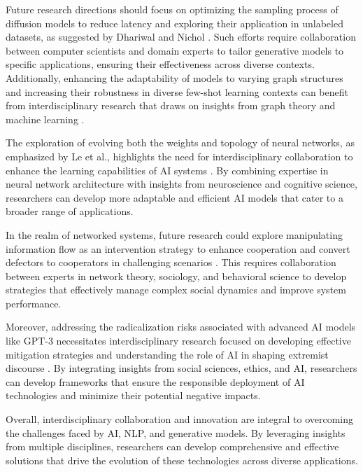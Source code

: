 Future research directions should focus on optimizing the sampling process of diffusion models to reduce latency and exploring their application in unlabeled datasets, as suggested by Dhariwal and Nichol \cite{dhariwal2021diffusion}. Such efforts require collaboration between computer scientists and domain experts to tailor generative models to specific applications, ensuring their effectiveness across diverse contexts. Additionally, enhancing the adaptability of models to varying graph structures and increasing their robustness in diverse few-shot learning contexts can benefit from interdisciplinary research that draws on insights from graph theory and machine learning \cite{ge2024psppretrainingstructureprompt}.



The exploration of evolving both the weights and topology of neural networks, as emphasized by Le et al., highlights the need for interdisciplinary collaboration to enhance the learning capabilities of AI systems \cite{le2019evolvingselfsupervisedneuralnetworks}. By combining expertise in neural network architecture with insights from neuroscience and cognitive science, researchers can develop more adaptable and efficient AI models that cater to a broader range of applications.



In the realm of networked systems, future research could explore manipulating information flow as an intervention strategy to enhance cooperation and convert defectors to cooperators in challenging scenarios \cite{chen2024adaptivenetworkinterventioncomplex}. This requires collaboration between experts in network theory, sociology, and behavioral science to develop strategies that effectively manage complex social dynamics and improve system performance.



Moreover, addressing the radicalization risks associated with advanced AI models like GPT-3 necessitates interdisciplinary research focused on developing effective mitigation strategies and understanding the role of AI in shaping extremist discourse \cite{mcguffie2020radicalizationrisksgpt3advanced}. By integrating insights from social sciences, ethics, and AI, researchers can develop frameworks that ensure the responsible deployment of AI technologies and minimize their potential negative impacts.



Overall, interdisciplinary collaboration and innovation are integral to overcoming the challenges faced by AI, NLP, and generative models. By leveraging insights from multiple disciplines, researchers can develop comprehensive and effective solutions that drive the evolution of these technologies across diverse applications.









